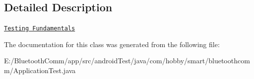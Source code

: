 \subsection{Detailed Description}
\href{http://d.android.com/tools/testing/testing_android.html}{\tt Testing Fundamentals} 

The documentation for this class was generated from the following file\+:\begin{DoxyCompactItemize}
\item 
E\+:/\+Bluetooth\+Comm/app/src/android\+Test/java/com/hobby/smart/bluetoothcomm/Application\+Test.\+java\end{DoxyCompactItemize}
